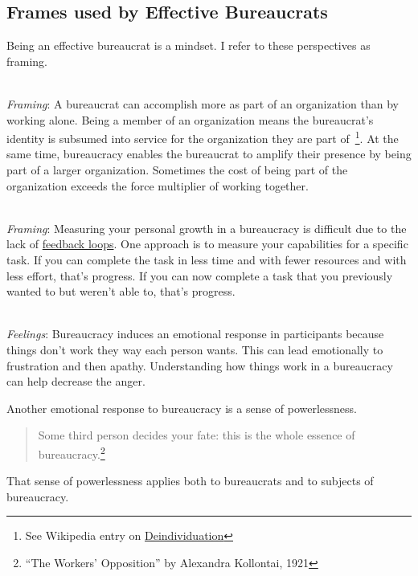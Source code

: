 \subsection*{Frames used by Effective Bureaucrats}

Being an effective bureaucrat is a mindset. I refer to these perspectives as framing. 

\ \\
\textit{Framing}: A bureaucrat can accomplish more as part of an organization than by working alone. Being a member of an organization means the bureaucrat's identity is subsumed into service for the organization they are part of~\footnote{See Wikipedia entry on \href{https://en.wikipedia.org/wiki/Deindividuation}{Deindividuation}
}. At the same time, bureaucracy enables the bureaucrat to amplify their presence by being part of a larger organization.  Sometimes the cost of being part of the organization exceeds the force multiplier of working together. 

\ \\
\textit{Framing}: Measuring your personal growth in a bureaucracy is difficult due to the lack of \hyperref[sec:feedback-loop-and-ripples]{feedback loops}. One approach is to measure your capabilities for a specific task. If you can complete the task in less time and with fewer resources and with less effort, that's progress. If you can now complete a task that you previously wanted to but weren't able to, that's progress.


\ \\
\textit{Feelings}: Bureaucracy induces an emotional response in participants because things don't work they way each person wants. This can lead emotionally to frustration and then apathy. Understanding how things work in a bureaucracy can help decrease the anger.


Another emotional response to bureaucracy is a sense of powerlessness. 
\begin{quote}
Some third person decides your fate: this is the whole essence of bureaucracy.\footnote{``The Workers' Opposition'' by Alexandra Kollontai, 1921}
\end{quote}
That sense of powerlessness applies both to bureaucrats and to subjects of bureaucracy. 

